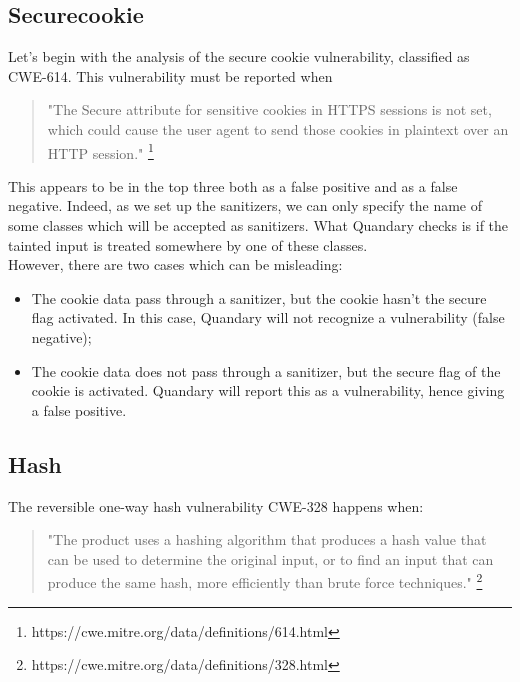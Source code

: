 \documentclass[../Report.tex]{subfiles}
\begin{document}
\subsection{Securecookie}
Let's begin with the analysis of the secure cookie vulnerability, classified as CWE-614. This vulnerability must be reported when 

	\begin{quote}"The Secure attribute for sensitive cookies in HTTPS sessions is not set, 
	which could cause the user agent to send those cookies in plaintext over an HTTP session." 
	\footnote{https://cwe.mitre.org/data/definitions/614.html}\end{quote}
	
This appears to be in the top three both as a false positive and as a false negative. Indeed, as we set up the sanitizers, we can only specify the name of some classes which will be accepted as sanitizers. What Quandary checks is if the tainted input is treated somewhere by one of these classes. \\
However, there are two cases which can be misleading:
\begin{itemize}
	\item The cookie data pass through a sanitizer, but the cookie hasn't the secure flag 
	activated. In this case, Quandary will not recognize a vulnerability (false negative);
	\item The cookie data does not pass through a sanitizer, but the secure flag of the cookie 
	is activated. Quandary will report this as a vulnerability, hence giving a false positive.
\end{itemize}

\subsection{Hash}

The reversible one-way hash vulnerability CWE-328 happens when: 

	\begin{quote}
		"The product uses a hashing algorithm that produces a hash value that can be used to 
		determine the original input, or to find an input that can produce the same hash, more
		efficiently than brute force techniques."
		\footnote{https://cwe.mitre.org/data/definitions/328.html}
	\end{quote}
\end{document}
